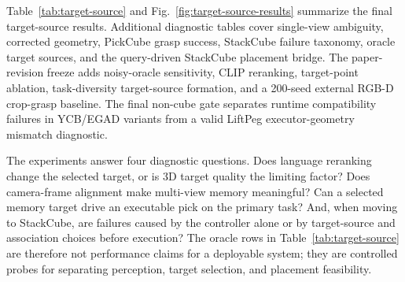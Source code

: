 \documentclass[conference]{IEEEtran}
\begin{document}
Table~\ref{tab:target-source} and Fig.~\ref{fig:target-source-results}
summarize the final target-source results. Additional diagnostic tables cover
single-view ambiguity, corrected geometry, PickCube grasp success, StackCube
failure taxonomy, oracle target sources, and the query-driven StackCube
placement bridge. The paper-revision freeze adds noisy-oracle sensitivity,
CLIP reranking, target-point ablation, task-diversity target-source
formation, and a 200-seed external RGB-D crop-grasp baseline. The final
non-cube gate separates runtime compatibility failures in YCB/EGAD variants
from a valid LiftPeg executor-geometry mismatch diagnostic.

The experiments answer four diagnostic questions. Does language reranking
change the selected target, or is 3D target quality the limiting factor? Does
camera-frame alignment make multi-view memory meaningful? Can a selected
memory target drive an executable pick on the primary task? And, when moving to
StackCube, are failures caused by the controller alone or by target-source and
association choices before execution? The oracle rows in Table~\ref{tab:target-source}
are therefore not performance claims for a deployable system; they are
controlled probes for separating perception, target selection, and placement
feasibility.
\end{document}
